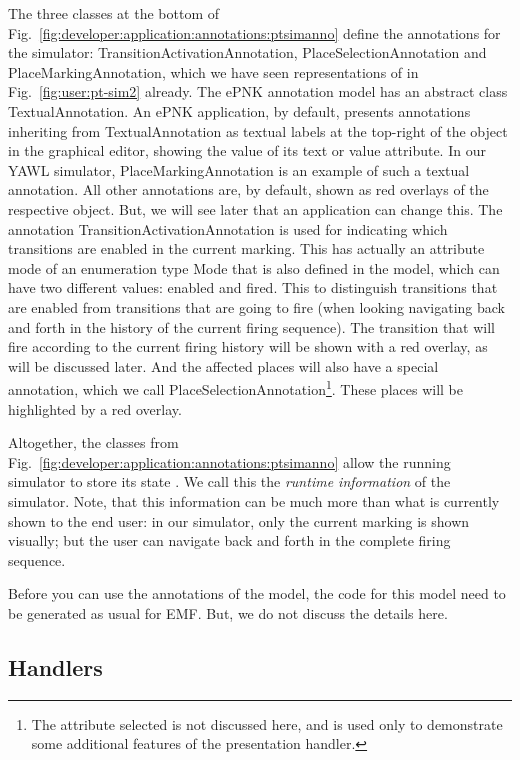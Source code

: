 The three classes at the bottom of
Fig.~\ref{fig:developer:application:annotations:ptsimanno} define the annotations
for the simulator: {\sf TransitionActivationAnnotation}, {\sf PlaceSelectionAnnotation} and
{\sf PlaceMarkingAnnotation}, which we have seen representations of in Fig.~\ref{fig:user:pt-sim2} already.
The ePNK annotation model has an abstract class {\sf TextualAnnotation}.
An ePNK application, by default, presents annotations inheriting from
{\sf TextualAnnotation} as textual labels at the top-right of the object
in the graphical editor, showing the value of its {\sf text} or {\sf value} attribute.
In our YAWL simulator, {\sf PlaceMarkingAnnotation} is an example of such a textual annotation.
All other  annotations are, by default, shown as red overlays of the respective
object. But, we will see later that an application can change this.
%
The annotation {\sf TransitionActivationAnnotation} is used for indicating which
transitions are enabled in the current marking. This has actually an attribute mode
of an enumeration type {\sf Mode} that is also defined in the model, which can
have two different values:  {\sf enabled} and {\sf fired}. This to distinguish
transitions that are enabled from transitions that are going to fire (when looking
navigating back and forth in the history of the current firing sequence). The
transition that will fire according to the current firing history will be
shown with a red overlay, as will be discussed later. And the affected places
will also have a special annotation, which we call {\sf PlaceSelectionAnnotation}\footnote
  {The attribute {\sf selected} is not discussed here, and is used only to
   demonstrate some additional features of the presentation handler.}.
These places will be highlighted by a red overlay.

Altogether, the classes from Fig.~\ref{fig:developer:application:annotations:ptsimanno}
allow the running simulator to store its {\sf state} .
We call this
the \emph{runtime information} of the simulator. Note, that this information can be
much more than what is currently shown to the end user: in our simulator, only
the current marking is shown visually; but the user can navigate back and forth
in the complete firing sequence.

Before you can use the annotations of the model, the code for this
model need to be generated as usual for EMF. But, we do not discuss the
details here.


\subsection{Handlers}
\label{subsec:developer:applications:handlers}

